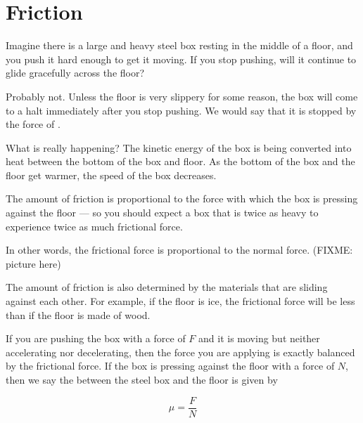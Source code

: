 \chapter{Friction}

Imagine there is a large and heavy steel box resting in the middle of a floor, and you push it hard enough to get it moving. If you stop pushing, will it continue to glide gracefully across the floor? 

Probably not. Unless the floor is very slippery for some reason, the box will come to a halt immediately after you stop pushing. We would say that it is stopped by the force of . 

What is really happening? The kinetic energy of the box is being converted into heat 
between the bottom of the box and floor. As the bottom of the box and the floor get warmer, the speed of the box decreases.

The amount of friction is proportional to the force with which the box is pressing against the floor --- so you should expect a box that is twice as heavy to experience twice as much frictional force.

In other words, the frictional force is proportional to the normal force.  (FIXME: picture here)

The amount of friction is also determined by the materials that are sliding against each other. For example, if the floor is ice, the frictional force will be less than if the floor is made of wood. 

If you are pushing the box with a force of $F$ and it is moving but neither accelerating nor decelerating, then the force you are applying is exactly balanced by the frictional force. If the box is pressing against the floor with a force of $N$, then we say the  between the steel box and the floor is given by

$$\mu = \frac{F}{N}$$

